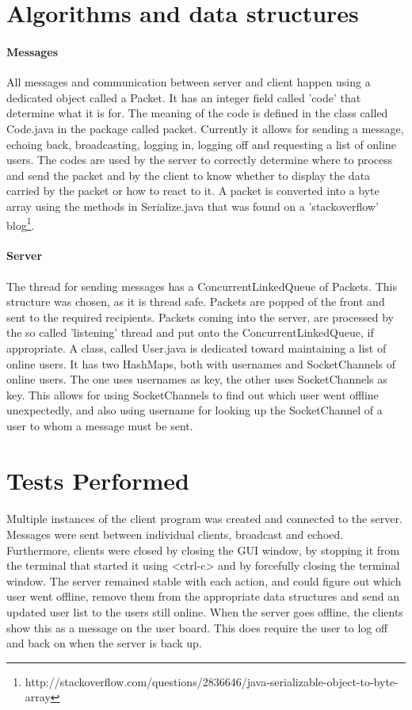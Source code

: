 \documentclass[12pt]{article}
\begin{document}
\section{Algorithms and data structures}

\paragraph{Messages}
All messages and communication between server and client happen using a
dedicated object called a Packet.  It has an integer field
called 'code' that determine what it is for.  The meaning of the code is defined
in the class called Code.java in the package called packet.  Currently it allows for
sending a message, echoing back, broadcasting, logging in, logging off and
requesting a list of online users. The codes are used by the server to correctly
determine where to process and send the packet and by the client to know whether
to display the data carried by the packet or how to react to it. A packet is
converted into a byte array using the methods in Serialize.java that was found
on a 'stackoverflow'
blog\footnote{http://stackoverflow.com/questions/2836646/java-serializable-object-to-byte-array}.

\paragraph{Server}
The thread for sending messages has a ConcurrentLinkedQueue of Packets.  This
structure was chosen, as it is thread safe.  Packets are popped of the front and
sent to the required recipients.  Packets coming into the server, are processed
by the so called 'listening' thread and put onto the ConcurrentLinkedQueue, if
appropriate.  A class, called User.java is dedicated toward maintaining a list
of online users.  It has two HashMaps, both with usernames and SocketChannels of
online users.  The one uses usernames as key, the other uses SocketChannels as
key.  This allows for using SocketChannels to find out which user went offline
unexpectedly, and also using username for looking up the SocketChannel of a user
to whom a message must be sent. 

\section{Tests Performed}

\paragraph{}
Multiple instances of the client program was created and connected to the
server.  Messages were sent between individual clients, broadcast and echoed.
Furthermore, clients were closed by closing the GUI window, by stopping it from
the terminal that started it using <ctrl-c> and by forcefully closing the terminal
window.  The server remained stable with each action, and could figure out which
user went offline, remove them from the appropriate data structures and send an
updated user list to the users still online.
When the server goes offline, the clients show this as a message on the
user board.  This does require the user to log off and back on when the server is
back up.  
\end{document}
